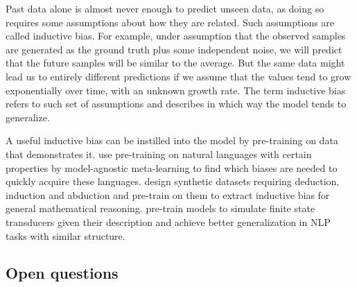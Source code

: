 \documentclass[a4paper, 11pt, oneside]{article}
\begin{document}
	Past data alone is almost never enough to predict unseen data, as doing so
	requires some assumptions about how they are related. Such assumptions are called
	inductive bias. For example, under assumption that the observed samples are generated
	as the ground truth plus some independent noise, we will predict that the
	future samples will be similar to the average. But the same data might lead us
	to entirely different predictions if we assume that the values tend to grow exponentially
	over time, with an unknown growth rate. The term inductive bias refers to such
	set of assumptions and describes in which way the model tends to generalize.

	A useful inductive bias can be instilled into the model by pre-training on data
	that demonstrates it. \citet{mccoy2020universal} use pre-training on natural languages
	with certain properties by model-agnostic meta-learning \cite{finn2017model} to
	find which biases are needed to quickly acquire these languages. \citet{wu2021lime}
	design synthetic datasets requiring deduction, induction and abduction and pre-train
	on them to extract inductive bias for general mathematical reasoning. \citet{lindemann2023injecting}
	pre-train models to simulate finite state transducers given their description
	and achieve better generalization in NLP tasks with similar structure.

	\subsection{Open questions}
\end{document}
